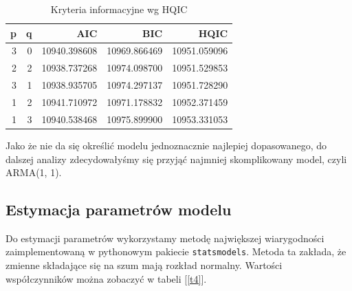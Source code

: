 \documentclass{article}
\theoremstyle{break}
\newcommand{\code}[1]{\colorbox{light-gray}{\texttt{#1}}}
\begin{document}
	\begin{table}[H]
		\centering
		\begin{tabular}{|r|r|r|r|r|}
			\hline
			\rowcolor[HTML]{C0C0C0} 
			{\color[HTML]{111111} \textbf{p}} & {\color[HTML]{111111} \textbf{q}} & {\color[HTML]{111111} \textbf{AIC}} & {\color[HTML]{111111} \textbf{BIC}} & {\color[HTML]{111111} \textbf{HQIC}} \\ \hline
			{\color[HTML]{111111} 3}          & {\color[HTML]{111111} 0}          & {\color[HTML]{111111} 10940.398608} & {\color[HTML]{111111} 10969.866469} & {\color[HTML]{111111} 10951.059096}  \\ \hline
			{\color[HTML]{111111} 2}          & {\color[HTML]{111111} 2}          & {\color[HTML]{111111} 10938.737268} & {\color[HTML]{111111} 10974.098700} & {\color[HTML]{111111} 10951.529853}  \\ \hline
			{\color[HTML]{111111} 3}          & {\color[HTML]{111111} 1}          & {\color[HTML]{111111} 10938.935705} & {\color[HTML]{111111} 10974.297137} & {\color[HTML]{111111} 10951.728290}  \\ \hline
			{\color[HTML]{111111} 1}          & {\color[HTML]{111111} 2}          & {\color[HTML]{111111} 10941.710972} & {\color[HTML]{111111} 10971.178832} & {\color[HTML]{111111} 10952.371459}  \\ \hline
			{\color[HTML]{111111} 1}          & {\color[HTML]{111111} 3}          & {\color[HTML]{111111} 10940.538468} & {\color[HTML]{111111} 10975.899900} & {\color[HTML]{111111} 10953.331053}  \\ \hline
		\end{tabular}
		\caption{Kryteria informacyjne wg HQIC}
		\label{t3}
	\end{table}
	
	Jako że nie da się określić modelu jednoznacznie najlepiej dopasowanego, do dalszej analizy zdecydowałyśmy się przyjąć najmniej skomplikowany model, czyli ARMA(1, 1).
	
	\subsection{Estymacja parametrów modelu}
	Do estymacji parametrów wykorzystamy metodę największej wiarygodności zaimplementowaną w pythonowym pakiecie \code{statsmodels}. Metoda ta zakłada, że zmienne składające się na szum mają rozkład normalny. Wartości współczynników można zobaczyć w tabeli [\ref{t4}].
	
\end{document}
